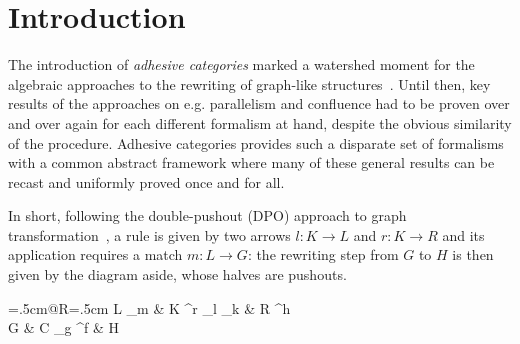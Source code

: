 \documentclass[3p]{elsarticle}
\theoremstyle{remark}
\theoremstyle{definition}
\begin{document}
\section{Introduction}
The introduction of \emph{adhesive categories} marked a watershed moment for the algebraic approaches 
to the rewriting of graph-like structures~\cite{lack2005adhesive,ehrig2006fundamentals}.
%
Until then, key results of the approaches on e.g. parallelism and confluence had to be proven 
over and over again for each different formalism at hand, %
despite the obvious similarity of the procedure.
%
Adhesive categories provides such a disparate set of formalisms with a common abstract framework 
where many of these general results can be recast and uniformly proved once and for all.
 
\vspace{.1cm}
\noindent
\begin{minipage}[l]{.78\linewidth}
		\setlength{\parindent}{1.5em}
		In short, following the double-pushout (DPO) approach
to graph transformation~\cite{CorradiniMREHL97,ehrig2006fundamentals}, 
a rule is given by two arrows $l: K \to L$ and $r: K \rightarrow R$
and its application requires a match $m: L \to G$: the rewriting step from $G$
to $H$ is then given by the diagram aside, whose halves are pushouts.
  \end{minipage}%
    \hfill 
  \begin{minipage}[r]{.20\linewidth }
    \xymatrix@C=.5cm@R=.5cm{
      L \ar[d]_{m}
      & K \ar[r]^r \ar[l]_{l} \ar[d]_{k} & R \ar [d]^h \\
      G & C \ar[r]_{g} \ar[l]^{f}                    & H
    }
  \end{minipage}
\end{document}
